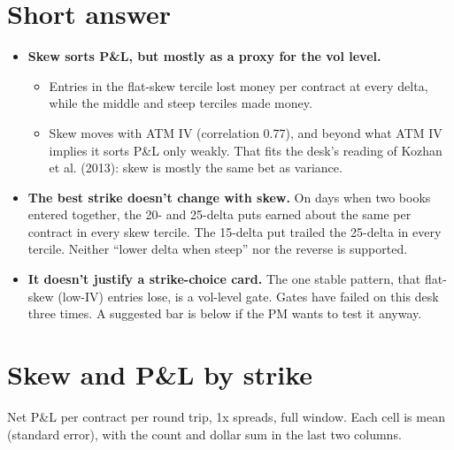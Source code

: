 \documentclass{article}
\begin{document}
\section{Short answer}

\begin{itemize}

\item \textbf{Skew sorts P\&L, but mostly as a proxy for the vol level.}

\begin{itemize}

\item Entries in the flat-skew tercile lost money per contract at every delta, while the middle and steep terciles made money.

\item Skew moves with ATM IV (correlation 0.77), and beyond what ATM IV implies it sorts P\&L only weakly. That fits the desk's reading of Kozhan et al. (2013): skew is mostly the same bet as variance.

\end{itemize}

\item \textbf{The best strike doesn't change with skew.} On days when two books entered together, the 20- and 25-delta puts earned about the same per contract in every skew tercile. The 15-delta put trailed the 25-delta in every tercile. Neither ``lower delta when steep'' nor the reverse is supported.

\item \textbf{It doesn't justify a strike-choice card.} The one stable pattern, that flat-skew (low-IV) entries lose, is a vol-level gate. Gates have failed on this desk three times. A suggested bar is below if the PM wants to test it anyway.

\end{itemize}

\section{Skew and P\&L by strike}

Net P\&L per contract per round trip, 1x spreads, full window. Each cell is mean (standard error), with the count and dollar sum in the last two columns.
\end{document}

